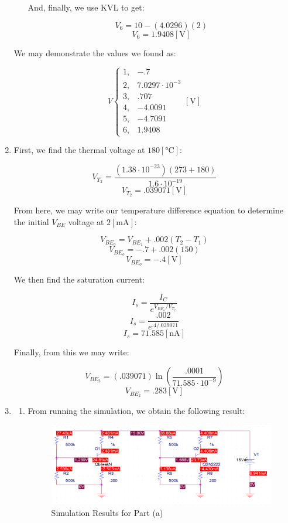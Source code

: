 \begin{enumerate}
\begin{itemize}
        And, finally, we use KVL to get:

        $$V_6=10-(4.0296)(2)$$
        $$\boxed{V_6=1.9408[\si{\volt}]}$$

    \end{itemize}

    We may demonstrate the values we found as:

    $$\boxed{V\left\{\begin{array}{ll} 1,& -.7\\2,&7.0297\cdot10^{-3}\\3,&.707\\4,&-4.0091\\5,&-4.7091\\6,&1.9408\end{array}[\si{\volt}]}$$

  \item

    First, we find the thermal voltage at $180[\si{\celsius}]$:

    $$V_{T_2}=\frac{\left( 1.38\cdot10^{-23} \right)(273+180)}{1.6\cdot10^{-19}}$$
    $$V_{T_2}=.039071[\si{\volt}]$$

    From here, we may write our temperature difference equation to determine the initial $V_{BE}$ voltage at $2[\si{\milli\ampere}]$:

    $$V_{BE_o}=V_{BE_1}+.002(T_2-T_1)$$
    $$V_{BE_o}=-.7+.002(150)$$
    $$V_{BE_o}=-.4[\si{\volt}]$$

    We then find the saturation current:

    $$I_s=\frac{I_C}{e^{V_{BE_o}/V_{T_2}}}$$
    $$I_s=\frac{.002}{e^{.4/.039071}}$$
    $$I_s=71.585[\si{\nano\ampere}]$$

    Finally, from this we may write:

    $$V_{BE_2}=(.039071)\ln\left( \frac{.0001}{71.585\cdot10^{-9}} \right)$$
    $$\boxed{V_{BE_2}=.283[\si{\volt}]}$$

  \item

    \begin{enumerate}

      \item 

        From running the simulation, we obtain the following result:

        \begin{figure}[H]
          \centering
          \includegraphics[width=.9\textwidth]{Figures/HW5-5a}
          \caption{Simulation Results for Part (a)}
          \label{fig:1}
        \end{figure}


\end{enumerate}
\end{enumerate}

